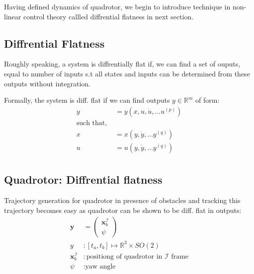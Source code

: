 Having defined dynamics of quadrotor, we begin to introduce technique in non-linear control theory callled diffrential flatness in next section.

\subsection{Diffrential Flatness}
Roughly speaking, a  system is diffrentially flat if, we can find a set of ouputs, equal to number of inputs s.t all states and inputs can be determined from these outputs without integration\cite{murray1995differential}.

Formally, the system is diff. flat if we can find outputs $y \in \mathbb{R}^m$ of form:
\begin{align*}
    y &= y(x, u, \dot{u}, \dots u^{(p)}) \\
\text{such that, }\\
x &= x(y, \dot{y}, \dots y^{(q)}) \\
u &= u(y, \dot{y}, \dots y^{(q)}) \\
\end{align*}

\subsection{Quadrotor: Diffrential flatness}
Trajectory generation for quadrotor in presence of obstacles and tracking this trajectory becomes easy as quadrotor can be shown to be diff. flat \cite{mellinger2011minimum} in outputs:
\begin{align*}
    \mathbf{y} &= \begin{pmatrix} \mathbf{x}^\mathcal{I}_b \\ \psi \end{pmatrix}\\
    y &:[t_a, t_b] \mapsto \mathbb{R}^3 \times SO(2)\\
    \mathbf{x}^\mathcal{I}_b &: \text{positiong of quadrotor in $\mathcal{I}$ frame}\\
    \psi &: \text{yaw angle}
\end{align*}
